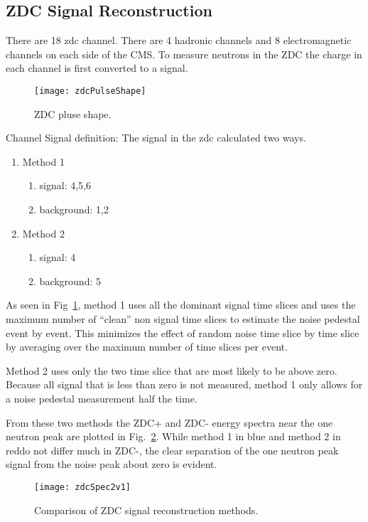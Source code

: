     \subsection{ZDC Signal Reconstruction}
      There are 18 zdc channel. 
      There are 4 hadronic channels and 8 electromagnetic channels on each side
        of the CMS. 
      To measure neutrons in the ZDC the charge in each channel is first 
        converted to a signal. 

	\begin{figure}[h]
		\centering
		\texttt{[image: zdcPulseShape]}
		\caption{ZDC pluse shape.}
		\label{fig:zdcPulseShape}
	\end{figure}

      Channel Signal definition:
      The signal in the zdc calculated two ways. 
      \begin{enumerate}
	\item Method 1
	\begin{enumerate}
	  \item signal: 4,5,6 
          \item background: 1,2
        \end{enumerate}
	\item Method 2
	\begin{enumerate}
	  \item signal: 4
	  \item background: 5
        \end{enumerate}
      \end{enumerate}

      As seen in Fig~\ref{fig:zdcPulseShape}, method 1 uses all the dominant 
        signal time slices and uses the maximum number of “clean” non signal 
        time slices to estimate the noise pedestal event by event. 
      This minimizes the effect of random noise time slice by time slice by 
        averaging over the maximum number of time slices per event. 

      Method 2 uses only the two time slice that are most likely to be above 
        zero. 
      Because all signal that is less than zero is not measured, method 1 
        only allows for a noise pedestal measurement half the time.
    
      From these two methods the ZDC+ and ZDC- energy spectra near the 
        one neutron peak are plotted in Fig.~\ref{fig:zdcSpec2v1}.
      While method 1 in blue and method 2 in reddo not differ much in ZDC-, 
        the clear separation of the one neutron peak signal from the noise 
        peak about zero is evident. 
      \begin{figure}[h]
        \centering
        \texttt{[image: zdcSpec2v1]}
        \caption{Comparison of ZDC signal reconstruction methods.}
        \label{fig:zdcSpec2v1}
      \end{figure}

